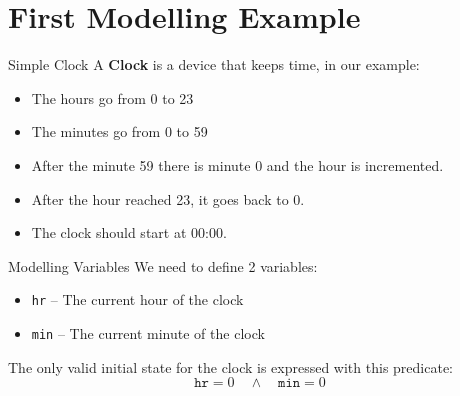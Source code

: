 \section[image=bgphoto_cut]{First Modelling Example}
\begin{frame}[plain]{}
    \sectionpage
\end{frame}

\begin{frame}{Simple Clock}
    A \textbf{Clock} is a device that keeps time, in our example:
    \begin{itemize}
        \item<1-> The hours go from 0 to 23
        \item<1-> The minutes go from 0 to 59
        \item<2-> After the minute 59 there is minute 0 and the hour is incremented.
        \item<2-> After the hour reached 23, it goes back to 0.
        \item<3-> The clock should start at 00:00.
    \end{itemize}
\end{frame}

\begin{frame}{Modelling Variables}
    We need to define 2 variables:
    \pause
    \begin{itemize}[<+->]
        \item \texttt{hr} -- The current hour of the clock
        \item \texttt{min} -- The current minute of the clock\demo
    \end{itemize}
    \onslide<+->
    \vspace{1cm}
    The only valid initial state for the clock is expressed with this predicate:
    \[
        \texttt{hr} = 0 \quad \land \quad \texttt{min} = 0
    \]
    \demo
\end{frame}

